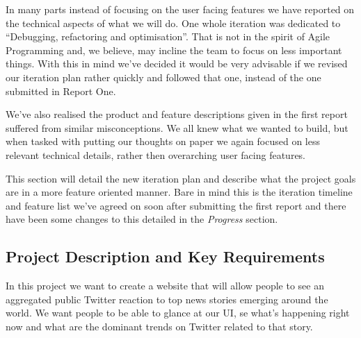 \documentclass[a4paper,12pt]{article}
\begin{document}
In many parts instead of focusing on the user facing features we have reported on the technical aspects of what we will do. One whole iteration was dedicated to ``Debugging, refactoring and optimisation''. That is not in the spirit of Agile Programming and, we believe, may incline the team to focus on less important things. With this in mind we've decided it would be very advisable if we revised our iteration plan rather quickly and followed that one, instead of the one submitted in Report One.

  We've also realised the product and feature descriptions given in the first report suffered from similar misconceptions. We all knew what we wanted to build, but when tasked with putting our thoughts on paper we again focused on less relevant technical details, rather then overarching user facing features.

  This section will detail the new iteration plan and describe what the project goals are in a more feature oriented manner. Bare in mind this is the iteration timeline and feature list we've agreed on soon after submitting the first report and there have been some changes to this detailed in the \emph{Progress} section. 

  \subsection{Project Description and Key Requirements}
  In this project we want to create a website that will allow people to see an aggregated public Twitter reaction to top news stories emerging around the world. We want people to be able to glance at our UI, se what's happening right now and what are the dominant trends on Twitter related to that story.
\end{document}
